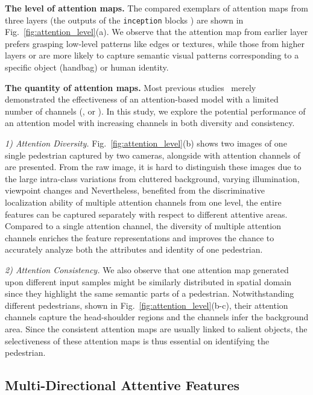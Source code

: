 \documentclass[10pt,twocolumn,letterpaper]{article}
\begin{document}
\noindent\textbf{The level of attention maps.}
The compared exemplars of attention maps from three layers (\ie the outputs of the \texttt{inception} blocks ) are shown in Fig.~\ref{fig:attention_level}(a).
We observe that the attention map from earlier layer  prefers grasping low-level patterns like edges or textures, while those from higher layers  or  are more likely to capture semantic visual patterns corresponding to a specific object (\eg handbag) or human identity.

\noindent\textbf{The quantity of attention maps.}
Most previous studies~\cite{xu2015show,newell2016stacked} merely demonstrated the effectiveness of an attention-based model with a limited number of channels (\ie,  or ).
In this study, we explore the potential performance of an attention model with increasing channels in both diversity and consistency.

\textit{1) Attention Diversity.}
Fig.~\ref{fig:attention_level}(b) shows two images of one single pedestrian captured by two cameras, alongside with  attention channels of  are presented.
From the raw image, it is hard to distinguish these images due to the large intra-class variations from cluttered background, varying illumination, viewpoint changes and \etc
Nevertheless, benefited from the discriminative localization ability of multiple attention channels from one level, the entire features can be captured separately with respect to different attentive areas.
Compared to a single attention channel, the diversity of multiple attention channels enriches the feature representations and improves the chance to accurately analyze both the attributes and identity of one pedestrian.

\textit{2) Attention Consistency.}
We also observe that one attention map generated upon different input samples might be similarly distributed in spatial domain since they highlight the same semantic parts of a pedestrian.
Notwithstanding different pedestrians, shown in Fig.~\ref{fig:attention_level}(b-c), their attention channels  capture the head-shoulder regions and the channels  infer the background area.
Since the consistent attention maps are usually linked to salient objects, the selectiveness of these attention maps is thus essential on identifying the pedestrian.


\subsection{Multi-Directional Attentive Features}
\label{subsec:multi_directional_attentive_features}
\end{document}
